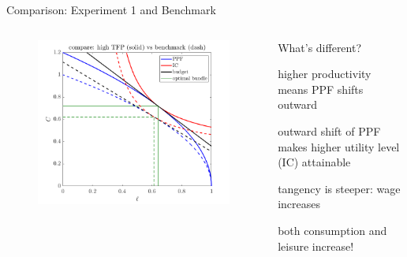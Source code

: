 \documentclass[11pt,aspectratio=169,usenames,dvipsnames]{beamer}
\let\tempone\itemize
\let\temptwo\enditemize
\renewenvironment{itemize}{\tempone\addtolength{\itemsep}{\fill}}{\temptwo}
\begin{document}
\begin{frame}{Comparison: Experiment 1 and Benchmark}
\label{slide:Comparison__Experiment_1_and_Benchmark}
\begin{columns}
    \begin{column}{0.5\textwidth}
        \begin{figure}
            \includegraphics[width=\textwidth]{./figures/Exp1BenchmarkCompare.png}
        \end{figure}
    \end{column}
    \begin{column}{0.5\textwidth}
        What’s different?
        \begin{itemize}
            \item higher productivity means PPF shifts outward
            \item outward shift of PPF makes higher utility level (IC) attainable
            \item tangency is steeper: wage increases
            \item both consumption and leisure increase!
        \end{itemize}
    \end{column}
\end{columns}
\end{frame}
\end{document}
